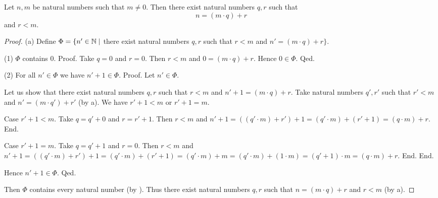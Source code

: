 \documentclass{article}
\begin{document}
  \begin{forthel}
    \begin{theorem}[title=Euclid's Division Theorem: Existence,id=euclid_existence]
      Let $n, m$ be natural numbers such that $m \neq 0$.
      Then there exist natural numbers $q, r$ such that
      \[n = (m \cdot q) + r\]
      and $r < m$.
    \end{theorem}
    \begin{proof}
      (a) Define $\Phi = \{ n' \in \mathbb{N} \mid$ there exist natural numbers $q, r$ such that $r < m$ and $n' = (m \cdot q) + r \}$.

      (1) $\Phi$ contains $0$.
      Proof.
        Take $q = 0$ and $r = 0$.
        Then $r < m$ and $0 = (m \cdot q) + r$.
        Hence $0 \in \Phi$.
      Qed.

      (2) For all $n' \in \Phi$ we have $n' + 1 \in \Phi$.
      Proof.
        Let $n' \in \Phi$.

        Let us show that there exist natural numbers $q, r$ such that $r < m$ and $n' + 1 = (m \cdot q) + r$.
          Take natural numbers $q', r'$ such that $r' < m$ and $n' = (m \cdot q') + r'$ (by a).
          We have $r' + 1 < m$ or $r' + 1 = m$.

          Case $r' + 1 < m$.
            Take $q = q' + 0$ and $r = r' + 1$. %
            Then $r < m$ and $n' + 1
              = ((q' \cdot m) + r') + 1
              = (q' \cdot m) + (r' + 1)
              = (q \cdot m) + r$.
          End.

          Case $r' + 1 = m$.
            Take  $q = q' + 1$ and $r = 0$.
            Then $r < m$ and
            $n' + 1
              = ((q' \cdot m) + r') + 1
              = (q' \cdot m) + (r' + 1)
              = (q' \cdot m) + m
              = (q' \cdot m) + (1 \cdot m)
              = (q' + 1) \cdot m
              = (q \cdot m) + r$.
          End.
        End.

        Hence $n' + 1 \in \Phi$.
      Qed.

      Then $\Phi$ contains every natural number (by ).
      Thus there exist natural numbers $q, r$ such that $n = (m \cdot q) + r$ and $r < m$ (by a).
    \end{proof}
  \end{forthel}
\end{document}
